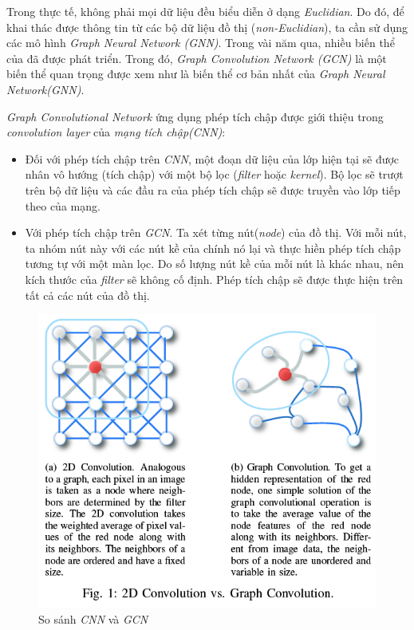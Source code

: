 Trong thực tế, không phải mọi dữ liệu đều biểu diễn ở dạng \textit{Euclidian}. Do đó, để khai thác được thông tin từ các bộ dữ liệu đồ thị (\textit{non-Euclidian}), ta cần sử dụng các mô hình \textit{Graph Neural Network (GNN)}. Trong vài năm qua, nhiều biến thể của đã được phát triển. Trong đó, \textit{Graph Convolution Network (GCN)} là một biến thể quan trọng được xem như là biến thể cơ bản nhất của \textit{Graph Neural Network(GNN)}.

\textit{Graph Convolutional Network} ứng dụng phép tích chập được giới thiệu trong \textit{convolution layer} của \textit{mạng tích chập(\textit{CNN})}:
\begin{itemize}
	\item Đối với phép tích chập trên \textit{\textit{CNN}}, một đoạn dữ liệu của lớp hiện tại sẽ được nhân vô hướng (tích chập) với một bộ lọc (\textit{filter} hoặc \textit{kernel}). Bộ lọc sẽ trượt trên bộ dữ liệu và các đầu ra của phép tích chập sẽ được truyền vào lớp tiếp theo của mạng.
	\item Với phép tích chập trên \textit{GCN}. Ta xét từng nút(\textit{node}) của đồ thị. Với mỗi nút, ta nhóm nút này với các nút kề của chính nó lại và thực hiền phép tích chập tương tự với một màn lọc. Do số lượng nút kề của mỗi nút là khác nhau, nên kích thước của \textit{filter} sẽ không cố định. Phép tích chập sẽ được thực hiện trên tất cả các nút của đồ thị.
\end{itemize}

\begin{figure}[H]
    \begin{center}
        \includegraphics[scale=0.6]{images/cnn-vs-gcn}
        \caption{So sánh \textit{CNN} và \textit{GCN}}
        \label{fig:\textit{CNN}-vs-gcn}
    \end{center}
\end{figure}

